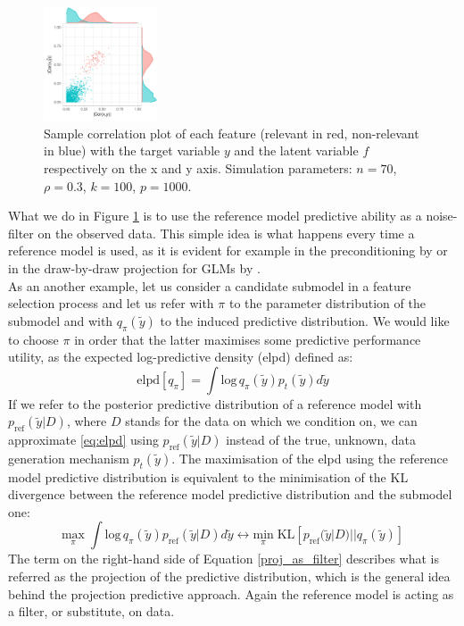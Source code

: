 \documentclass[american,]{article}
\theoremstyle{definition}
\begin{document}
\begin{figure}[tp]
  \centering
  \includegraphics[width=0.3\textwidth]{graphics/correlation.pdf}
  \caption{Sample correlation plot of each feature (relevant in red, non-relevant in blue) with the target variable $y$ and the latent variable $f$ respectively on the x and y axis. Simulation parameters: $n=70$, $\rho=0.3$, $k=100$, $p=1000$.\\}
  \label{fig:correlation}
\end{figure}

What we do in Figure \ref{fig:correlation} is to use the reference model predictive ability as a noise-filter on the observed data. This simple idea is what happens every time a reference model is used, as it is evident for example in the preconditioning by \cite{paper:paul_preconditioning} or in the draw-by-draw projection for GLMs by \cite{paper:original_proj}.\\
As an another example, let us consider a candidate submodel in a feature selection process and let us refer with $\pi$ to the parameter distribution of the submodel and with $q_{\pi}(\tilde{y})$ to the induced predictive distribution. We would like to choose $\pi$ in order that the latter maximises some predictive performance utility, as the expected log-predictive density (elpd) defined as:
\
\begin{equation}\label{eq:elpd}
\text{elpd}[q_{\pi}]=\int \text{log}\,q_{\pi}(\tilde{y})p_{t}(\tilde{y})d\tilde{y} 
\end{equation}
If we refer to the posterior predictive distribution of a reference model with $p_{\text{ref}}(\tilde{y}|D)$, where $D$ stands for the data on which we condition on, we can approximate \eqref{eq:elpd} using $p_{\text{ref}}(\tilde{y}|D)$ instead of the true, unknown, data generation mechanism $p_{t}(\tilde{y})$. The maximisation of the elpd using the reference model predictive distribution is equivalent to the minimisation of the KL divergence between the reference model predictive distribution and the submodel one:
\
\begin{equation} \label{proj_as_filter}
\underset{\pi}{\text{max}} \; \int \text{log}\,q_{\pi}(\tilde{y})p_{\text{ref}}(\tilde{y}|D)d\tilde{y} \leftrightarrow \underset{\pi}{\text{min}} \; \text{KL}[p_{\text{ref}}(\tilde{y}|D)||q_{\pi}(\tilde{y})] 
\end{equation}
The term on the right-hand side of Equation \eqref{proj_as_filter} describes what is referred as the projection of the predictive distribution, which is the general idea behind the projection predictive approach. Again the reference model is acting as a filter, or substitute, on data.
\end{document}
